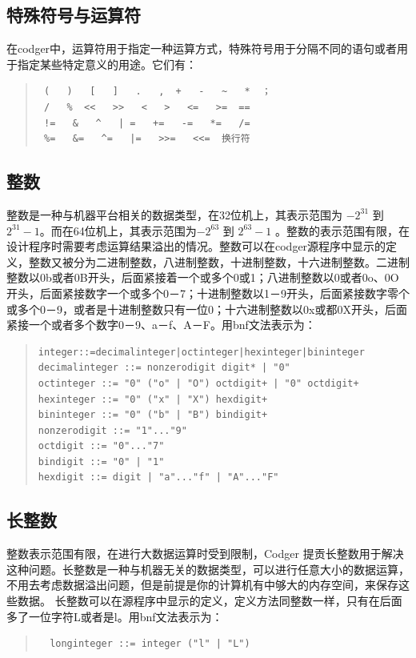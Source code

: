 \documentclass[a4paper,11pt]{article}
\begin{document}
\begin{CJK}{UTF8}{gbsn}
\subsection{特殊符号与运算符}
在codger中，运算符用于指定一种运算方式，特殊符号用于分隔不同的语句或者用于指定某些特定意义的用途。它们有：
\begin{quote}
\begin{verbatim}
 (   )   [   ]   .   ,  +   -   ~   *  ；
 /   %  <<   >>   <   >   <=   >=  ==
 !=   &   ^   | =   +=   -=   *=   /= 
 %=   &=   ^=   |=   >>=   <<=  换行符
\end{verbatim}
\end{quote}
\subsection{整数}
整数是一种与机器平台相关的数据类型，在32位机上，其表示范围为 $-2^{31}$ 到 $2^{31}-1$。而在64位机上，其表示范围为$-2^{63}$ 到 $2^{63}-1$ 。整数的表示范围有限，在设计程序时需要考虑运算结果溢出的情况。整数可以在codger源程序中显示的定义，整数又被分为二进制整数，八进制整数，十进制整数，十六进制整数。二进制整数以0b或者0B开头，后面紧接着一个或多个0或1；八进制整数以0或者0o、0O开头，后面紧接数字一个或多个0－7；十进制整数以1－9开头，后面紧接数字零个或多个0－9，或者是十进制整数只有一位0；十六进制整数以0x或都0X开头，后面紧接一个或者多个数字0－9、a－f、A－F。用bnf文法表示为：
\begin{quote}
\begin{verbatim}
integer::=decimalinteger|octinteger|hexinteger|bininteger
decimalinteger ::= nonzerodigit digit* | "0"
octinteger ::= "0" ("o" | "O") octdigit+ | "0" octdigit+
hexinteger ::= "0" ("x" | "X") hexdigit+
bininteger ::= "0" ("b" | "B") bindigit+
nonzerodigit ::= "1"..."9"
octdigit ::= "0"..."7"
bindigit ::= "0" | "1"
hexdigit ::= digit | "a"..."f" | "A"..."F"
\end{verbatim}
\end{quote}

\subsection{长整数}
整数表示范围有限，在进行大数据运算时受到限制，Codger 提贡长整数用于解决这种问题。长整数是一种与机器无关的数据类型，可以进行任意大小的数据运算，不用去考虑数据溢出问题，但是前提是你的计算机有中够大的内存空间，来保存这些数据。 长整数可以在源程序中显示的定义，定义方法同整数一样，只有在后面多了一位字符L或者是l。用bnf文法表示为：
\begin{quote}
 \begin{verbatim}
  longinteger ::= integer ("l" | "L")
 \end{verbatim}
\end{quote}


\end{CJK}
\end{document}

